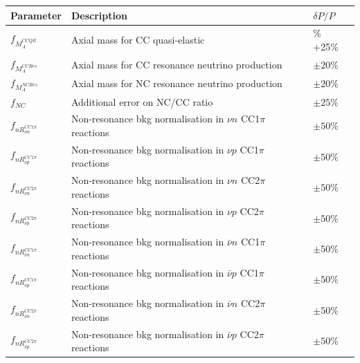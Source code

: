 \begin{table}[h!]
    \renewcommand{\arraystretch}{1.4}
    \begin{tabular}{p{1.8cm} p{10cm}>{\centering\arraybackslash}p{ 2.2cm}}
        \toprule
         Parameter & Description & $\delta P / P$ \\
        \midrule
         $f_{M_{A}^{CCQE}}$  & Axial mass for CC quasi-elastic & -15\% +25\% \\
         
         $f_{M_{A}^{CCRes}}$ & Axial mass for CC resonance neutrino production & $\pm 20\%$ \\
         
         $f_{M_{A}^{NCRes}}$ & Axial mass for NC resonance neutrino production & $\pm 20\%$ \\
         
         $f_{NC}$              & Additional error on NC/CC ratio & $\pm 25\%$ \\
         
         $f_{nR_{\nu n}^{CC1\pi}}$ & Non-resonance bkg normalisation in $\nu n$ CC1$\pi$ reactions & $\pm 50\%$ \\
         
         $f_{nR_{\nu p}^{CC1\pi}}$ & Non-resonance bkg normalisation in $\nu p$ CC1$\pi$ reactions & $\pm 50\%$ \\
         
         $f_{nR_{\nu n}^{CC2\pi}}$ & Non-resonance bkg normalisation in $\nu n$ CC2$\pi$ reactions & $\pm 50\%$ \\
         
         $f_{nR_{\nu p}^{CC2\pi}}$ & Non-resonance bkg normalisation in $\nu p$ CC2$\pi$ reactions & $\pm 50\%$ \\
         
         $f_{nR_{\bar{\nu} n}^{CC1\pi}}$ & Non-resonance bkg normalisation in $\bar{\nu} n$ CC1$\pi$ reactions & $\pm 50\%$ \\
         
         $f_{nR_{\bar{\nu} p}^{CC1\pi}}$ & Non-resonance bkg normalisation in $\bar{\nu} p$ CC1$\pi$ reactions & $\pm 50\%$ \\
         
         $f_{nR_{\bar{\nu} n}^{CC2\pi}}$ & Non-resonance bkg normalisation in $\bar{\nu} n$ CC2$\pi$ reactions & $\pm 50\%$ \\
         
         $f_{nR_{\bar{\nu} p}^{CC2\pi}}$ & Non-resonance bkg normalisation in $\bar{\nu} p$ CC2$\pi$ reactions & $\pm 50\%$ \\
        

\end{tabular}
\end{table}
